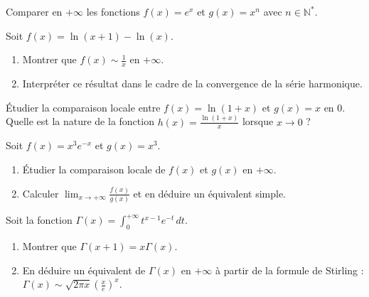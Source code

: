 \begin{exercice}
Comparer en \( +\infty \) les fonctions \( f(x) = e^x \) et \( g(x) = x^n \) avec \( n \in \mathbb{N}^* \).
\end{exercice}

\begin{exercice}
Soit \( f(x) = \ln(x+1) - \ln(x) \).
\begin{enumerate}
    \item Montrer que \( f(x) \sim \frac{1}{x} \) en \( +\infty \).
    \item Interpréter ce résultat dans le cadre de la convergence de la série harmonique.
\end{enumerate}
\end{exercice}

\begin{exercice}
Étudier la comparaison locale entre \( f(x) = \ln(1+x) \) et \( g(x) = x \) en \( 0 \). Quelle est la nature de la fonction \( h(x) = \frac{\ln(1+x)}{x} \) lorsque \( x \to 0 \) ?
\end{exercice}

\begin{exercice}
Soit \( f(x) = x^3 e^{-x} \) et \( g(x) = x^3 \).
\begin{enumerate}
    \item Étudier la comparaison locale de \( f(x) \) et \( g(x) \) en \( +\infty \).
    \item Calculer \( \lim_{x \to +\infty} \frac{f(x)}{g(x)} \) et en déduire un équivalent simple.
\end{enumerate}
\end{exercice}

\begin{exercice}
Soit la fonction \( \Gamma(x) = \int_0^{+\infty} t^{x-1} e^{-t} \, dt \). 
\begin{enumerate}
    \item Montrer que \( \Gamma(x+1) = x \Gamma(x) \).
    \item En déduire un équivalent de \( \Gamma(x) \) en \( +\infty \) à partir de la formule de Stirling : \( \Gamma(x) \sim \sqrt{2\pi x} \left(\frac{x}{e}\right)^x \).
\end{enumerate}
\end{exercice}
